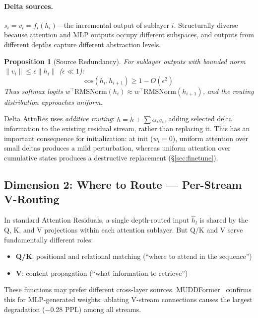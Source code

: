 \documentclass{article}
\newtheorem{proposition}{Proposition}
\begin{document}
\paragraph{Delta sources.} $s_i = v_i = f_i(h_i)$---the incremental output of sublayer $i$. Structurally diverse because attention and MLP outputs occupy different subspaces, and outputs from different depths capture different abstraction levels.

\begin{proposition}[Source Redundancy]
For sublayer outputs with bounded norm $\|v_i\| \leq \epsilon \|h_i\|$ ($\epsilon \ll 1$):
\begin{equation}
    \mathrm{cos}(h_i, h_{i+1}) \geq 1 - O(\epsilon^2)
\end{equation}
Thus softmax logits $w^\top \mathrm{RMSNorm}(h_i) \approx w^\top \mathrm{RMSNorm}(h_{i+1})$, and the routing distribution approaches uniform.
\end{proposition}

Delta AttnRes uses \emph{additive routing}: $h = \tilde{h} + \sum \alpha_i v_i$, adding selected delta information to the existing residual stream, rather than replacing it. This has an important consequence for initialization: at init ($w_l = 0$), uniform attention over small deltas produces a mild perturbation, whereas uniform attention over cumulative states produces a destructive replacement (\S\ref{sec:finetune}).

\subsection{Dimension 2: Where to Route --- Per-Stream V-Routing}
\label{sec:where}

In standard Attention Residuals, a single depth-routed input $\hat{h}_l$ is shared by the Q, K, and V projections within each attention sublayer. But Q/K and V serve fundamentally different roles:
\begin{itemize}
    \item \textbf{Q/K}: positional and relational matching (``where to attend in the sequence'')
    \item \textbf{V}: content propagation (``what information to retrieve'')
\end{itemize}
These functions may prefer different cross-layer sources. MUDDFormer~\citep{wang2024muddformer} confirms this for MLP-generated weights: ablating V-stream connections causes the largest degradation ($-$0.28 PPL) among all streams.
\end{document}
